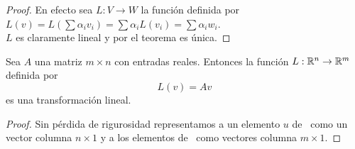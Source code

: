 \begin{proof}
En efecto sea $L: V \to W$ la función definida por $L(v) = L(\sum \alpha_i v_i) = \sum \alpha_i L(v_i) = \sum \alpha_i w_i$.
\\
$L$ es claramente lineal y por el teorema %
es única.
\end{proof}

\begin{theorem}
Sea $A$ una matriz $m \times n$ con entradas reales. Entonces la función $L : \mathbb{R}^n \to \mathbb{R}^m $ definida por $$L(v)= A v$$
es una transformación lineal.
\end{theorem}

\begin{proof}
Sin pérdida de rigurosidad representamos a un elemento $u$ de \rn \ como un vector columna $n \times 1$ y a los elementos de \rmm \ como vectores columna $m \times 1$.
\end{proof}




